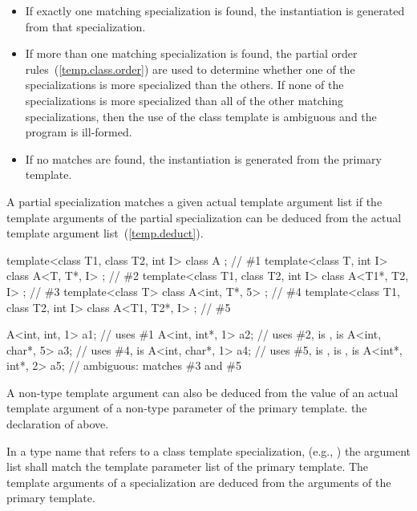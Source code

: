 \begin{itemize}
\item
If exactly one matching specialization is found, the instantiation is
generated from that specialization.
\item
If more than one matching specialization is found,
the partial order rules~(\ref{temp.class.order}) are used to determine
whether one of the specializations is more specialized than the
others.
If none of the specializations is more specialized than all of the
other matching specializations, then the use of the class template
is ambiguous and the program is ill-formed.
\item
If no matches are found, the instantiation is generated from the
primary template.
\end{itemize}

\pnum
A partial specialization matches a given actual template argument
list if the template arguments of the partial specialization can be
deduced from the actual template argument list~(\ref{temp.deduct}).
\enterexample

\begin{codeblock}
template<class T1, class T2, int I> class A             { };    // \#1
template<class T, int I>            class A<T, T*, I>   { };    // \#2
template<class T1, class T2, int I> class A<T1*, T2, I> { };    // \#3
template<class T>                   class A<int, T*, 5> { };    // \#4
template<class T1, class T2, int I> class A<T1, T2*, I> { };    // \#5

A<int, int, 1>   a1;            // uses \#1
A<int, int*, 1>  a2;            // uses \#2,  is ,  is 
A<int, char*, 5> a3;            // uses \#4,  is 
A<int, char*, 1> a4;            // uses \#5,  is ,  is ,  is 
A<int*, int*, 2> a5;            // ambiguous: matches \#3 and \#5
\end{codeblock}
\exitexample

\pnum
A non-type template argument can also be deduced from the value of an actual
template argument of a non-type parameter of the primary template.
\enterexample
the declaration of
above.
\exitexample

\pnum
In a type name that refers to a class template specialization, (e.g.,
)
the argument list shall match the template parameter list of the primary
template.
The template arguments of a specialization are deduced from the arguments
of the primary template.

